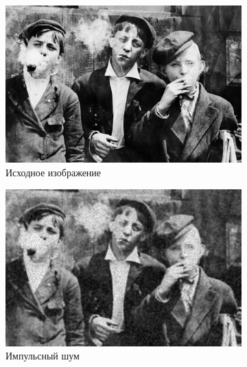 \begin{figure}[ht!] 
    \centering
    \begin{subfigure}[b]{0.5\linewidth}
        \centering
        \includegraphics[width=0.95\linewidth]{../lewis-hine-taschen-main-3.jpg} 
        \caption{Исходное изображение} 
        \label{wiener_7:a} 
        \vspace{4ex}
    \end{subfigure}%
    \begin{subfigure}[b]{0.5\linewidth}
      \centering
      \includegraphics[width=0.95\linewidth]{../Wiener_Filter/Wiener_Impulse_noise_(k=7).jpg} 
      \caption{Импульсный шум} 
      \label{weiner_7:b} 
      \vspace{4ex}
    \end{subfigure}
    \begin{subfigure}[b]{0.5\linewidth}
      \centering

\end{subfigure}
\end{figure}
